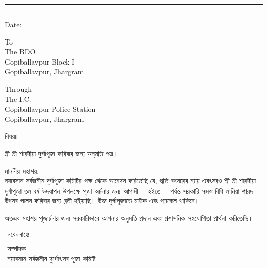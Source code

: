 
\begin{center}
    \myheader
    \end{center}
    \hrule \vspace*{2pt} \hrule  \vspace*{20pt}
    \begin{adjustwidth}{15mm}{15mm}\large 
        \begin{flushright} 
            Date: \underline{\datecontainer}
        \end{flushright}\large\vspace{1cm}
        
        \noindent To\\
        The BDO\\
        Gopiballavpur Block-I\\
        Gopiballavpur, Jhargram 
        
        \vspace{.5cm}
        \noindent Through\\
        
        \vspace{.25cm}
        \noindent 
        The I.C.\\
        Gopiballavpur Police Station\\
        Gopiballavpur, Jhargram\\ 
        
        \noindent\begin{minipage}{.1\textwidth}বিষয়ঃ 
        \end{minipage}\begin{minipage}{.8\textwidth} 
            \underline{
            শ্রী শ্রী শারদীয়া দুর্গাপূজা করিবার জন্য অনুমতি পত্র। 
        }
        \end{minipage}
        \vspace{.5cm}
        
        \noindent মাননীয় মহাশয়,\\
        \hspace*{1.5cm} নয়াবসান সর্বজনীন দুর্গাপূজা কমিটির পক্ষ থেকে আবেদন করিতেছি যে, প্রতি বৎসরের ন্যায় এবৎসরও  শ্রী শ্রী শারদীয়া দুর্গাপূজা \PujaYear তম বর্ষ উদযাপন উপলক্ষে পূজা অর্চনার জন্য আগামী \PermissionFrom\ \FromDay\ হইতে \PermissionTo\ \ToDay\ পর্যন্ত সরকারি সমস্ত বিধি মানিয়া শারদ উৎসব পালন করিবার জন্য ব্রতী হইয়াছি। উক্ত দুর্গাপূজাতে মাইক এবং প্যান্ডেল থাকিবে। 
        
        \hspace{2cm}
        অতএব মহাশয় পূজার্চনার জন্য সরকারিভাবে আপনার অনুমতি প্রদান এবং প্রশাসনিক সহযোগিতা প্রার্থনা করিতেছি। \\  
        
        
        \vspace{2ex}
        \begin{flushright}
            $\begin{array}{c}
            \mbox{নবেদনান্তে}
            \\ \\ \\
            \mbox{সম্পাদক}\\\mbox{নয়াবসান সর্বজনীন দুর্গোৎসব পূজা কমিটি}\end{array}$
        \end{flushright}
    \end{adjustwidth}
    